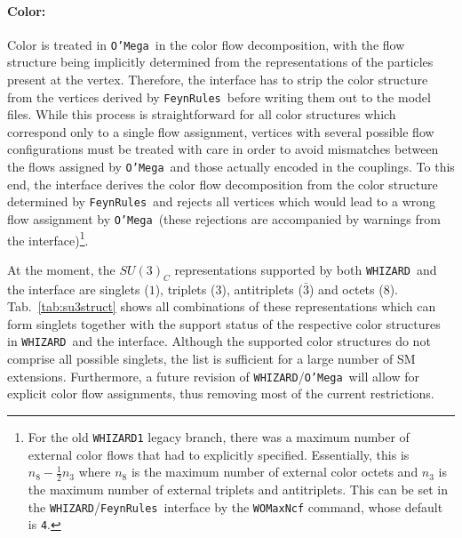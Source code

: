 \documentclass[12pt]{book}
\newcommand{\ttt}[1]{\texttt{#1}}
\newcommand{\whizard}{\ttt{WHIZARD}}
\newcommand{\oMega}{\ttt{O'Mega}}
\newcommand{\FeynRules}{\ttt{FeynRules}}
\begin{document}
\paragraph{\bf Color:}
%
Color is treated in \oMega\ in the color flow decomposition,
with the flow structure being implicitly determined from
the representations of the particles present at the vertex. Therefore, the
interface has to strip the color structure from the vertices derived by
\FeynRules\ before writing them out to the model files.
While this process is straightforward for all color structures which
correspond only to a single flow assignment, vertices with several
possible flow configurations must be treated with care in order to
avoid mismatches between the flows assigned by \oMega\ and those
actually encoded in the couplings. To this end, the interface derives
the color flow decomposition from the color structure determined by
\FeynRules\ and rejects all vertices which would lead to a wrong flow
assignment by \oMega\ (these rejections are accompanied by warnings
from the interface)\footnote{For the old \whizard\ttt{1} legacy
  branch, there was a maximum number of external color flows that had
  to explicitly specified. Essentially, this is $n_8 - \frac{1}{2}n_3$
  where $n_8$ is the maximum number of external color octets and $n_3$
  is the maximum number of external triplets and antitriplets. This
  can be set in the \whizard/\FeynRules\ interface by the
  \ttt{WOMaxNcf} command, whose default is \ttt{4}.}.

At the moment, the $SU(3)_C$ representations supported by
both \whizard\ and the interface are singlets ($1$), triplets ($3$),
antitriplets ($\bar{3}$) and octets ($8$). Tab.~\ref{tab:su3struct}
shows all combinations of these representations which can
form singlets together with the support status of the respective color
structures in \whizard\ and the interface. Although the supported
color structures do not comprise all possible singlets, the list is
sufficient for a large number of SM extensions. Furthermore, a future
revision of \whizard/\oMega\ will allow for explicit color flow
assignments, thus removing most of the current restrictions.
\end{document}
